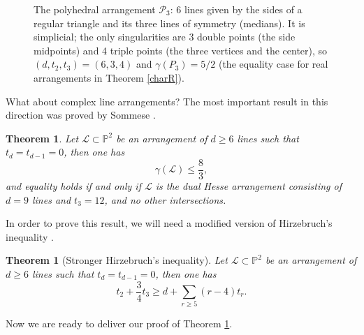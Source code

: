 \documentclass{article}
\theoremstyle{plain}
\newtheorem{theorem}[thm]{Theorem}
\theoremstyle{definition}
\numberwithin{equation}{section}
\begin{document}
\begin{figure}[h]
    \centering
\caption{The polyhedral arrangement $\mathcal{P}_3$: 6 lines given by the sides of a regular triangle and its three lines of symmetry (medians). It is simplicial; the only singularities are 3 double points (the side midpoints) and 4 triple points (the three vertices and the center), so $(d,t_2,t_3)=(6,3,4)$ and $\gamma(P_3)=5/2$ (the equality case for real arrangements in Theorem \ref{charR}).}
\end{figure}
What about complex line arrangements? The most important result in this direction was proved by Sommese \cite{Sommese}.
\begin{theorem}
\label{somm}
Let $\mathcal{L} \subset \mathbb{P}^{2}$ be an arrangement of $d\geq 6$ lines such that $t_{d}=t_{d-1}=0$, then one has 
\[\gamma(\mathcal{L}) \leq \frac{8}{3},\]
and equality holds if and only if $\mathcal{L}$ is the dual Hesse arrangement consisting of $d=9$ lines and $t_{3}=12$, and no other intersections.
\end{theorem}
In order to prove this result, we will need a modified version of Hirzebruch's inequality \cite[p. 140]{Hirzebruch}.
\begin{theorem}[Stronger Hirzebruch's inequality]
Let $\mathcal{L} \subset \mathbb{P}^{2}$ be an arrangement of $d\geq 6$ lines such that $t_{d}=t_{d-1}=0$, then one has
\begin{equation}
t_{2} + \frac{3}{4}t_{3} \geq d + \sum_{r\geq 5}(r-4)t_{r}.
\end{equation}
\end{theorem}
Now we are ready to deliver our proof of Theorem \ref{somm}.
\end{document}
